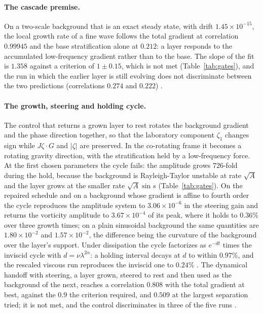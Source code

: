 \documentclass[11pt]{article}
\theoremstyle{remark}
\newcommand{\ev}[1]{\hspace{0.2em}{\small\textsf{[#1]}}}
\begin{document}
\paragraph{The cascade premise.} On a two-scale background that is an exact steady state, with drift
$1.45\times10^{-15}$, the local growth rate of a fine wave follows the total gradient at correlation
$0.99945$ and the base stratification alone at $0.212$: a layer responds to the accumulated
low-frequency gradient rather than to the base. The slope of the fit is $1.358$ against a criterion
of $1\pm0.15$, which is not met (Table~\ref{tab:gates}), and the run in which the earlier layer is
still evolving does not discriminate between the two predictions (correlations $0.274$ and $0.222$)
\ev{MV}.

\paragraph{The growth, steering and holding cycle.} The control that returns a grown layer to rest
rotates the background gradient and the phase direction together, so that the laboratory component
$\zeta_{1}$ changes sign while $J\zeta\cdot G$ and $|\zeta|$ are preserved. In the co-rotating frame it
becomes a rotating gravity direction, with the stratification held by a low-frequency force. At the
first chosen parameters the cycle fails: the amplitude grows $726$-fold during the hold, because the
background is Rayleigh-Taylor unstable at rate $\sqrt A$ and the layer grows at the smaller rate
$\sqrt A\sin s$ (Table~\ref{tab:gates}). On the repaired schedule and on a background whose gradient
is affine to fourth order the cycle reproduces the amplitude system to
$3.06\times10^{-6}$ in the steering gain and returns the vorticity amplitude to $3.67\times10^{-4}$ of
its peak, where it holds to $0.36\%$ over three growth times; on a plain sinusoidal background the
same quantities are $1.80\times10^{-2}$ and $1.57\times10^{-2}$, the difference being the curvature of
the background over the layer's support. Under dissipation the cycle factorizes as $e^{-dt}$ times the
inviscid cycle with $d=\nu\lambda^{2\alpha}$: a holding interval decays at $d$ to within $0.97\%$, and
the rescaled viscous run reproduces the inviscid one to $0.24\%$ \ev{MV}. The dynamical handoff with
steering, a layer grown, steered to rest and then used as the background of the next, reaches a
correlation $0.808$ with the total gradient at best, against the $0.9$ the criterion required, and
$0.509$ at the largest separation tried; it is not met, and the control discriminates in three of the
five runs \ev{MV}.
\end{document}
